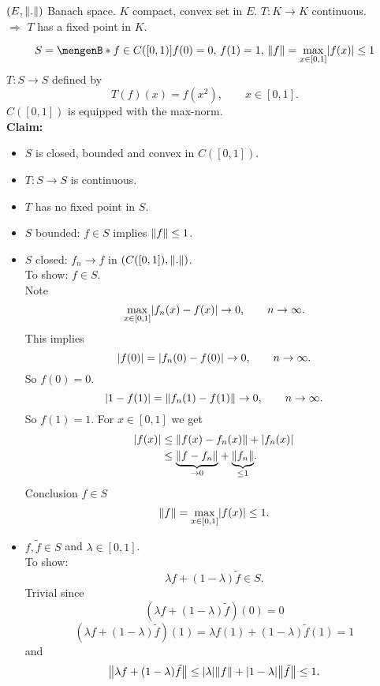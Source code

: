 \begin{theorem}
	$(E, \norm{.})$ Banach space. $K$ compact, convex set in $E$. $T: K \to K$ continuous. \\
	$\Rightarrow $ $T$ has a fixed point in $K$.
\end{theorem}
\begin{beispiel}
	\[
		S = \set[f \in C([0,1])]{f(0) = 0,\, f(1)=1,\, \norm{f} = \max\limits_{x \in [0,1]} \abs{f(x)} \leq 1}
	\]
	$T: S \to S$ defined by
	\[
		T(f)(x) = f(x^2), \qquad x \in [0,1].
	\]
	$C([0,1])$ is equipped with the max-norm. \\
	\textbf{Claim:} \text{    }     \begin{itemize}
		\item $S$ is closed, bounded and convex in $C([0,1])$.
		\item $T: S \to S$ is continuous.
		\item $T$ has no fixed point in $S$.
	\end{itemize}
	\begin{itemize}
		\item 
	$S$ bounded: $f \in S$ implies $\norm{f}\leq 1$. 
	\item $S$ closed: $f_n \to f$ in $(C([0,1]),\norm{.})$. \\
	To show: $f \in S$. \\
	Note \[
		\max_{x \in [0,1]}\lvert f_n(x)-f(x)\rvert \to 0, \qquad n \to \infty.
	\]
	This implies
	\[
		\lvert f(0)\rvert = \lvert f_n(0)-f(0)\rvert \to 0, \qquad n \to \infty.
	\]
	So $f(0)=0$.
	\[
		\abs{1-f(1)} = \norm{f_n(1)-f(1)} \to 0, \qquad n \to \infty.
	\]
	So $f(1)=1$. For $x \in [0,1]$ we get
	\begin{align*}
		\abs{f(x)} &\leq \norm{f(x)-f_n(x)} + \abs{f_n(x)} \\
		&\leq \underset{\to 0}{\underbrace{\norm{f-f_n}}} + \underset{\leq 1}{\underbrace{\norm{f_n}}}. 
	\end{align*}
	Conclusion $f \in S$
	\[
		\norm{f} = \max_{x \in [0,1]}\abs{f(x)} \leq 1.
	\]
	\item $f,\tilde f \in S$ and $\lambda \in [0,1]$. \\
	To show: 
	\[
		\lambda f + (1- \lambda) \tilde f \in S.
	\]
	Trivial since
	\[
		(\lambda f + (1-\lambda) \tilde f)(0) = 0 
	\]
	\[
		(\lambda f + (1- \lambda) \tilde f)(1) = \lambda f(1)+ (1- \lambda)\tilde f(1)= 1
	\]
	and	
	\[
		\norm{\lambda f + (1-\lambda) \tilde f} \leq \abs{\lambda} \norm{f} + \abs{1- \lambda} \norm{ \tilde f} \leq 1.
	\]
	\end{itemize}

\end{beispiel}
